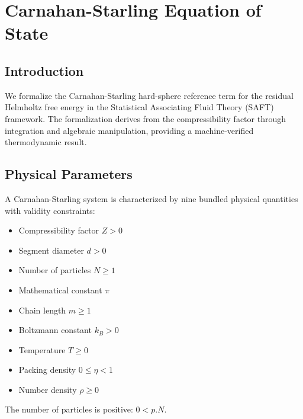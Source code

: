 
\chapter{Carnahan-Starling Equation of State}

\section{Introduction}

We formalize the Carnahan-Starling hard-sphere reference term for the residual Helmholtz free energy in the Statistical Associating Fluid Theory (SAFT) framework. The formalization derives from the compressibility factor through integration and algebraic manipulation, providing a machine-verified thermodynamic result.

\section{Physical Parameters}

\begin{definition}
\label{def:primitive_vars}
\leanok
A Carnahan-Starling system is characterized by nine bundled physical quantities with validity constraints:
\begin{itemize}
  \item Compressibility factor $Z > 0$
  \item Segment diameter $d > 0$
  \item Number of particles $N \geq 1$
  \item Mathematical constant $\pi$
  \item Chain length $m \geq 1$
  \item Boltzmann constant $k_B > 0$
  \item Temperature $T \geq 0$
  \item Packing density $0 \leq \eta < 1$
  \item Number density $\rho \geq 0$
\end{itemize}
\end{definition}

\begin{theorem}
\label{thm:N_pos}
\leanok
The number of particles is positive: $0 < p.N$.
\end{theorem}

